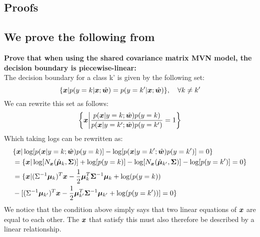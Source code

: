 \newpage
\begin{appendices}


\section{Proofs}

\subsection{We prove the following from } \label{Proofs:linear-decision-boundary}
\textbf{Prove that when using the shared covariance matrix MVN model, the decision boundary is piecewise-linear:}\\
The decision boundary for a class k' is given by the following set:
\begin{equation}
    \{\bm{x} | p(y=k| \bm{x} ; \hat{\bm{w}}) = p(y=k' | \bm{x}; \hat{\bm{w}})\}, \quad \forall k \neq k'
\end{equation}
We can rewrite this set as follows:
\begin{equation}
    \left\{\bm{x} \middle| \frac{p(\bm{x}|y=k;\hat{\bm{w}}) p(y=k)}{p(\bm{x}|y=k';\hat{\bm{w}}) p(y=k')} =1 \right\}
\end{equation}
Which taking logs can be rewritten as:
\begin{align}
    &{} \{ \bm{x} | \log[p(\bm{x} | y=k;\hat{\bm{w}})p(y=k)] - \log[p(\bm{x} | y=k';\hat{\bm{w}})p(y=k')] =0 \} \\
    & = \{ \bm{x} | \log[N_{\bm{x}}(\hat{\bm{\mu}}_{k}, \bm{\Sigma})] + \log[p(y=k)] - \log[N_{\bm{x}}(\hat{\bm{\mu}}_{k'}, \bm{\Sigma})] - \log[p(y=k')] =0 \} \\
    &= \{ \bm{x} | (\Sigma^{-1} \bm{\mu}_{k})^{T} \bm{x} -\frac{1}{2} \bm{\mu}_{k}^{T} \bm{\Sigma}^{-1} \bm{\mu}_{k} + \log(p(y=k)) \\  &- [(\Sigma^{-1} \bm{\mu}_{k'})^{T} \bm{x} -\frac{1}{2} \bm{\mu}_{k'}^{T} \bm{\Sigma}^{-1} \bm{\mu}_{k'} + \log(p(y=k'))] = 0 \}
\end{align}
We notice that the condition above simply says that two linear equations of $\bm{x}$ are equal to each other. The $\bm{x}$ that satisfy this must also therefore be described by a linear relationship.



\end{appendices}
